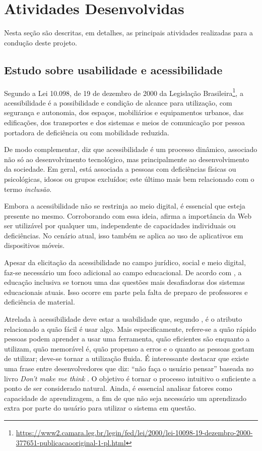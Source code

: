 \chapter{Atividades Desenvolvidas}\label{sec:ativ_desenvolvidas}
Nesta seção são descritas, em detalhes, as principais atividades realizadas para a condução deste projeto.

\section{Estudo sobre usabilidade e acessibilidade}\label{sec:estudos_usab_acess} 

Segundo a Lei 10.098, de 19 de dezembro de 2000 da Legislação Brasileira\footnote{\url{https://www2.camara.leg.br/legin/fed/lei/2000/lei-10098-19-dezembro-2000-377651-publicacaooriginal-1-pl.html}}, a acessibilidade é a possibilidade e condição de alcance para utilização, com segurança e autonomia, dos
espaços, mobiliários e equipamentos urbanos, das edificações, dos transportes e dos sistemas e meios de comunicação por pessoa portadora de deficiência ou com mobilidade reduzida. 

De modo complementar, \cite{torres2002acessibilidade} diz que acessibilidade é um processo dinâmico, associado não só ao desenvolvimento tecnológico, mas principalmente ao desenvolvimento da sociedade. Em geral, está associada a pessoas com deficiências físicas ou psicológicas, idosos ou grupos excluídos; este último mais bem relacionado com o termo \textit{inclusão}. 

Embora a acessibilidade não se restrinja ao meio digital, é essencial que esteja presente no mesmo. Corroborando com essa ideia, \cite{leew3c} afirma a importância da Web ser utilizável por qualquer um, independente de capacidades individuais ou deficiências. No cenário atual, isso também se aplica ao uso de aplicativos em dispositivos móveis.

Apesar da elicitação da acessibilidade no campo jurídico, social e meio digital, faz-se necessário um foco adicional ao campo educacional. De acordo com \cite{Bine2018DigitalIT}, a educação inclusiva se tornou uma das questões mais desafiadoras dos sistemas educacionais atuais. Isso ocorre em parte pela falta de preparo de professores e deficiência de material.

Atrelada à acessibilidade deve estar a usabilidade que, segundo \cite{nielsenPrioritizingWebUsability},
é o atributo relacionado a quão fácil é usar algo. Mais especificamente, refere-se a quão rápido pessoas podem aprender a usar uma ferramenta, quão eficientes são enquanto a utilizam, quão memorável é, quão propenso a erros e o quanto as pessoas gostam de utilizar; deve-se tornar a utilização fluida. É interessante destacar que existe uma frase entre desenvolvedores que diz: ``não faça o usuário pensar'' baseada no livro \textit{Don't make me think} \citep{steveDont2005}. O objetivo é tornar o processo intuitivo o suficiente a ponto de ser considerado natural.
Ainda, é essencial analisar fatores como capacidade de aprendizagem, a fim de que não seja necessário um aprendizado extra por parte do usuário para utilizar o sistema em questão.

